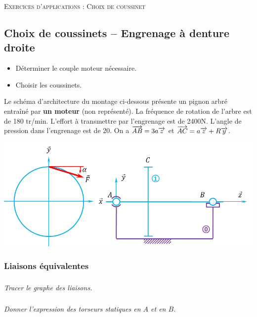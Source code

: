 \documentclass[10pt]{article}
\begin{document}

\begin{center}
\Large{\textsc{Exercices d'applications : Choix de coussinet}}
\end{center}

\vspace{.25cm}

\subsection*{Choix de coussinets -- Engrenage à denture droite}

\begin{obj}
\begin{itemize}
\item Déterminer le couple moteur nécessaire.
\item Choisir les coussinets.
\end{itemize}
\end{obj}


Le schéma d'architecture du montage ci-dessous présente un pignon arbré entraîné par \textbf{un moteur} (non représenté). La fréquence de rotation de l'arbre est de 180 tr/min.
L'effort à transmettre par l'engrenage est de 2400N. L'angle de pression dans l'engrenage est de 20\textdegree. On a $\overrightarrow{AB} = 3a \overrightarrow{z}$ et $\overrightarrow{AC} = a\overrightarrow{z}  + R \overrightarrow{y}$.

\begin{center}
\includegraphics[width=.75\textwidth]{images/modele}
\end{center}

\subsubsection*{Liaisons équivalentes}

\subparagraph{}
\textit{Tracer le graphe des liaisons.}

\subparagraph{}
\textit{Donner l'expression des torseurs statiques en $A$ et en $B$.}
\end{document}
